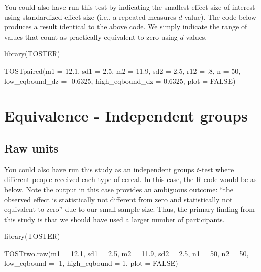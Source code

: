 \documentclass[
]{krantz}
\makeatletter
\newenvironment{Shaded}{\begin{snugshade}}{\end{snugshade}}
\newcommand{\AttributeTok}[1]{\textcolor[rgb]{0.61,0.61,0.61}{#1}}
\newcommand{\ConstantTok}[1]{\textcolor[rgb]{0,0,0}{#1}}
\newcommand{\DecValTok}[1]{\textcolor[rgb]{0.06,0.06,0.06}{#1}}
\newcommand{\FloatTok}[1]{\textcolor[rgb]{0.06,0.06,0.06}{#1}}
\newcommand{\FunctionTok}[1]{\textcolor[rgb]{0,0,0}{#1}}
\newcommand{\NormalTok}[1]{#1}
\newcommand{\SpecialCharTok}[1]{\textcolor[rgb]{0,0,0}{#1}}
\newenvironment{kframe}{%
\medskip{}
\setlength{\fboxsep}{.8em}
 \def\at@end@of@kframe{}%
 \ifinner\ifhmode%
  \def\at@end@of@kframe{\end{minipage}}%
  \begin{minipage}{\columnwidth}%
 \fi\fi%
 \def\FrameCommand##1{\hskip\@totalleftmargin \hskip-\fboxsep
 \colorbox{shadecolor}{##1}\hskip-\fboxsep
     \hskip-\linewidth \hskip-\@totalleftmargin \hskip\columnwidth}%
 \MakeFramed {\advance\hsize-\width
   \@totalleftmargin\z@ \linewidth\hsize
   \@setminipage}}%
 {\par\unskip\endMakeFramed%
 \at@end@of@kframe}
\renewenvironment{Shaded}{\begin{kframe}}{\end{kframe}}
\makeatother
\begin{document}
You could also have run this test by indicating the smallest effect size of interest using standardized effect size (i.e., a repeated measures \(d\)-value). The code below produces a result identical to the above code. We simply indicate the range of values that count as practically equivalent to zero using \(d\)-values.

\begin{Shaded}
\begin{Highlighting}[]
\FunctionTok{library}\NormalTok{(TOSTER)}

\FunctionTok{TOSTpaired}\NormalTok{(}\AttributeTok{m1 =} \FloatTok{12.1}\NormalTok{,}
        \AttributeTok{sd1 =} \FloatTok{2.5}\NormalTok{,}
        \AttributeTok{m2 =} \FloatTok{11.9}\NormalTok{,}
        \AttributeTok{sd2 =} \FloatTok{2.5}\NormalTok{,}
        \AttributeTok{r12 =}\NormalTok{ .}\DecValTok{8}\NormalTok{,}
        \AttributeTok{n =} \DecValTok{50}\NormalTok{,}
        \AttributeTok{low\_eqbound\_dz =} \SpecialCharTok{{-}}\FloatTok{0.6325}\NormalTok{,}
        \AttributeTok{high\_eqbound\_dz =} \FloatTok{0.6325}\NormalTok{,}
        \AttributeTok{plot =} \ConstantTok{FALSE}\NormalTok{)}
\end{Highlighting}
\end{Shaded}

\hypertarget{equivalence---independent-groups}{%
\section{Equivalence - Independent groups}\label{equivalence---independent-groups}}

\hypertarget{raw-units-1}{%
\subsection{Raw units}\label{raw-units-1}}

You could also have run this study as an independent groups \(t\)-test where different people received each type of cereal. In this case, the R-code would be as below. Note the output in this case provides an ambiguous outcome: ``the observed effect is statistically not different from zero and statistically not equivalent to zero'' due to our small sample size. Thus, the primary finding from this study is that we should have used a larger number of participants.

\begin{Shaded}
\begin{Highlighting}[]
\FunctionTok{library}\NormalTok{(TOSTER)}


\FunctionTok{TOSTtwo.raw}\NormalTok{(}\AttributeTok{m1 =} \FloatTok{12.1}\NormalTok{,}
        \AttributeTok{sd1 =} \FloatTok{2.5}\NormalTok{,}
        \AttributeTok{m2 =} \FloatTok{11.9}\NormalTok{,}
        \AttributeTok{sd2 =} \FloatTok{2.5}\NormalTok{,}
        \AttributeTok{n1 =} \DecValTok{50}\NormalTok{,}
        \AttributeTok{n2 =} \DecValTok{50}\NormalTok{,}
        \AttributeTok{low\_eqbound =} \SpecialCharTok{{-}}\DecValTok{1}\NormalTok{,}
        \AttributeTok{high\_eqbound =} \DecValTok{1}\NormalTok{,}
        \AttributeTok{plot =} \ConstantTok{FALSE}\NormalTok{)}
\end{Highlighting}
\end{Shaded}
\end{document}

